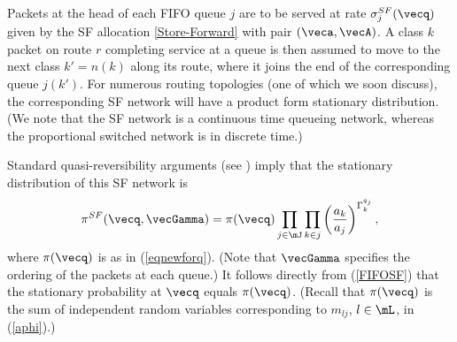 \documentclass{amsart}
\begin{document}
Packets at the head of each FIFO queue $j$ are to be served at rate $\sigma_j^{SF}(\vecq)$ given by the SF allocation \eqref{Store-Forward} with pair $(\veca,\vecA)$. A class $k$ packet on route $r$ completing service at a queue is then assumed to move to the next class $k'=n(k)$
along its route, where it joins the end of the corresponding queue $j(k')$. 
 For numerous routing topologies (one of which we soon discuss), the corresponding SF network 
will have a product form stationary distribution.  (We note that the SF network is a continuous time
queueing network, whereas the proportional switched network is in discrete time.)

Standard quasi-reversibility arguments (see \cite{Ke79}) imply that the stationary distribution of this SF network is
\begin{equation}
\label{FIFOSF}
\pi^{SF} (\vecq,\vecGamma) = {\pi(\vecq)} \prod_{j\in\mJ} \prod_{k\in j} \left(\frac{a_k}{a_j}\right)^{\Gamma_k^{q_j}},
\end{equation}
where $\pi (\vecq)$ is as in (\ref{eqnewforq}).  (Note that $\vecGamma$ specifies the ordering
of the packets at each queue.)  It follows directly from (\ref{FIFOSF}) that the stationary
probability at $\vecq$ equals $\pi (\vecq)$.  
(Recall that $\pi (\vecq)$ is the
sum of independent random variables corresponding to $m_{lj}$, $l\in\mL$,
in (\ref{aphi}).) 
\end{document}
